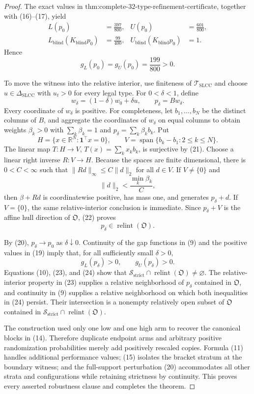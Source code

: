 \documentclass{article}
\begin{document}
\begin{proof}
The exact values in \(\text{thm:complete-32-type-refinement-certificate}\), together with (16)--(17), yield
\[
 \begin{aligned}
 L(p_0)&=\frac{397}{800},&
 U(p_0)&=\frac{601}{800},\\
 L_{\mathrm{blind}}(K_{\mathrm{blind}}p_0)&=\frac{99}{400},&
 U_{\mathrm{blind}}(K_{\mathrm{blind}}p_0)&=1.
 \end{aligned}
\tag{18}
\]
Hence
\[
 g_L(p_0)=g_U(p_0)=\frac{199}{800}>0.
\tag{19}
\]

To move the witness into the relative interior, use finiteness of \(\mathcal T_{\mathrm{SLCC}}\) and choose \(u\in\Delta_{\mathrm{SLCC}}\) with \(u_t>0\) for every legal type.  For \(0<\delta<1\), define
\[
 w_\delta=(1-\delta)w_0+\delta u,
 \qquad p_\delta=Bw_\delta.
\tag{20}
\]
Every coordinate of \(w_\delta\) is positive.  For completeness, let \(b_1,\ldots,b_N\) be the distinct columns of \(B\), and aggregate the coordinates of \(w_\delta\) on equal columns to obtain weights \(\beta_k>0\) with \(\sum_k\beta_k=1\) and \(p_\delta=\sum_k\beta_kb_k\).  Put
\[
 H=\{x\in\mathbb R^N:\mathbf 1^{\top}x=0\},
 \qquad
 V=\operatorname{span}\{b_k-b_1:2\leq k\leq N\}.
\tag{21}
\]
The linear map \(T:H\to V\), \(T(x)=\sum_kx_kb_k\), is surjective by (21).  Choose a linear right inverse \(R:V\to H\).  Because the spaces are finite dimensional, there is \(0<C<\infty\) such that \(\|Rd\|_\infty\leq C\|d\|_2\) for all \(d\in V\).  If \(V\neq\{0\}\) and
\[
 \|d\|_2<\frac{\min_k\beta_k}{C},
\tag{22}
\]
then \(\beta+Rd\) is coordinatewise positive, has mass one, and generates \(p_\delta+d\).  If \(V=\{0\}\), the same relative-interior conclusion is immediate.  Since \(p_\delta+V\) is the affine hull direction of \(\mathfrak O\), (22) proves
\[
 p_\delta\in\operatorname{relint}(\mathfrak O).
\tag{23}
\]

By (20), \(p_\delta\to p_0\) as \(\delta\downarrow0\).  Continuity of the gap functions in (9) and the positive values in (19) imply that, for all sufficiently small \(\delta>0\),
\[
 g_L(p_\delta)>0,
 \qquad
 g_U(p_\delta)>0.
\tag{24}
\]
Equations (10), (23), and (24) show that
\(\mathcal S_{\mathrm{strict}}\cap\operatorname{relint}(\mathfrak O)\neq\varnothing\).  The relative-interior property in (23) supplies a relative neighborhood of \(p_\delta\) contained in \(\mathfrak O\), and continuity in (9) supplies a relative neighborhood on which both inequalities in (24) persist.  Their intersection is a nonempty relatively open subset of \(\mathfrak O\) contained in \(\mathcal S_{\mathrm{strict}}\cap\operatorname{relint}(\mathfrak O)\).

The construction used only one low and one high arm to recover the canonical blocks in (14).  Therefore duplicate endpoint arms and arbitrary positive randomization probabilities merely add positively rescaled copies.  Formula (11) handles additional performance values; (15) isolates the bracket stratum at the boundary witness; and the full-support perturbation (20) accommodates all other strata and configurations while retaining strictness by continuity.  This proves every asserted robustness clause and completes the theorem.
\end{proof}
\end{document}
